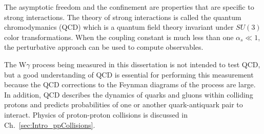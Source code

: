 The asymptotic freedom and the confinement are properties that are specific to strong interactions. The theory of strong interactions is called the quantum chromodymanics (QCD) which is a quantum field theory invariant under $SU(3)$ color transformations. When the coupling constant is much less than one $\alpha_s \ll 1$, the perturbative approach can be used to compute observables.

The W$\gamma$ process being measured in this dissertation is not intended to test QCD, but a good understanding of QCD is essential for performing this measurement because the QCD corrections to the Feynman diagrams of the process are large. In addition, QCD describes the dynamics of quarks and gluons within colliding protons and predicts probabilities of one or another quark-antiquark pair to interact. Physics of proton-proton collisions is discussed in Ch.~\ref{sec:Intro_ppCollisions}. 

